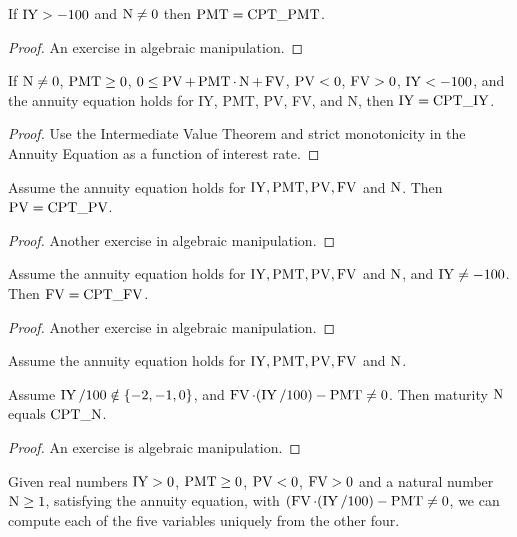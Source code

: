 \begin{lemma}\label{PMT_eq_CPT_PMT}
	\leanok
	If $\operatorname{IY} > -100$ and $\operatorname{N} \ne 0$ then $\operatorname{PMT}=\operatorname{CPT\_PMT}$.
\end{lemma}
\begin{proof}
	\leanok
	An exercise in algebraic manipulation.
\end{proof}
\begin{lemma}\label{IY_eq_CPT_IY}
	\leanok
	If $\operatorname{N} \ne 0$, $\operatorname{PMT} \ge 0$, $0 \le \operatorname{PV} + \operatorname{PMT} \cdot \operatorname{N} + \operatorname{FV}$, $\operatorname{PV} < 0$, $\operatorname{FV} > 0$, $\operatorname{IY} < -100$, and the annuity equation holds for
  IY, PMT, PV, FV, and N, then $\operatorname{IY}=\operatorname{CPT\_IY}$.
\end{lemma}
\begin{proof}
	\leanok
	Use the Intermediate Value Theorem and strict monotonicity
	in the Annuity Equation as a function of interest rate.
\end{proof}
\begin{lemma}\label{PV_eq_CPT_PV}
	\leanok
	Assume the annuity equation holds for $\operatorname{IY}, \operatorname{PMT}, \operatorname{PV}, \operatorname{FV}$ and $\operatorname{N}$. Then
	$\operatorname{PV}=\operatorname{CPT\_PV}$.
\end{lemma}
\begin{proof}
	\leanok
	Another exercise in algebraic manipulation.
\end{proof}
\begin{lemma}\label{FV_eq_CPT_FV}
	\leanok
	Assume the annuity equation holds for $\operatorname{IY}, \operatorname{PMT}, \operatorname{PV}, \operatorname{FV}$ and $\operatorname{N}$, and $\operatorname{IY} \ne -100$. Then
	$\operatorname{FV}=\operatorname{CPT\_FV}$.
\end{lemma}
\begin{proof}
	\leanok
	Another exercise in algebraic manipulation.
\end{proof}
\begin{lemma}\label{N_eq_CPT_N}
	\leanok
	Assume the annuity equation holds for $\operatorname{IY}, \operatorname{PMT}, \operatorname{PV}, \operatorname{FV}$ and $\operatorname{N}$.
	
	Assume $\operatorname{IY}/100\notin\{-2,-1,0\}$, and
    $\operatorname{FV} \cdot (\operatorname{IY} / 100) - \operatorname{PMT} \ne 0$.
	Then maturity $\operatorname{N}$ equals $\operatorname{CPT\_N}$.
\end{lemma}
\begin{proof}
\leanok
An exercise is algebraic manipulation.
\end{proof}
\begin{theorem}\label{annuity_equation_unique_solvability}
	\leanok
	Given real numbers $\operatorname{IY}>0$, $\operatorname{PMT}\ge 0$, $\operatorname{PV}<0$, $\operatorname{FV}>0$ and a natural number $\operatorname{N} \ge 1$,
	satisfying the annuity equation, with 
	$(\operatorname{FV} \cdot (\operatorname{IY} / 100) - \operatorname{PMT} \ne 0$, we can compute each of the five variables uniquely from the other four.
\end{theorem}
